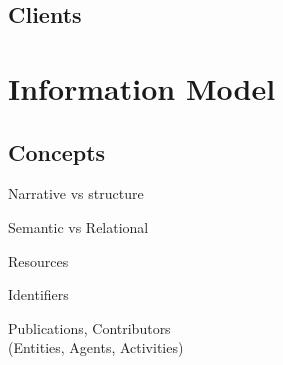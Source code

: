 \documentclass{beamer}
\begin{document}
\subsection{Clients}



\section{Information Model}
\subsection{Concepts}
\begin{frame}
    \begin{center}
        \Huge Narrative vs structure
    \end{center}
\end{frame}

\begin{frame}
    \begin{center}
        \Huge Semantic vs Relational
    \end{center}
\end{frame}

\begin{frame}
    \begin{center}
        \Huge Resources
    \end{center}
\end{frame}

\begin{frame}
    \begin{center}
        \Huge Identifiers
    \end{center}
\end{frame}

\begin{frame}
    \begin{center}
        \Huge Publications, Contributors\\
        (Entities, Agents, Activities)
    \end{center}
\end{frame}
\end{document}
